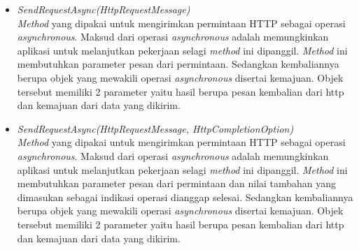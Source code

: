 \begin{itemize}
	\item \textit{SendRequestAsync(HttpRequestMessage)} \\
	\textit{Method} yang dipakai untuk mengirimkan permintaan HTTP sebagai operasi \textit{asynchronous}. Maksud dari operasi \textit{asynchronous} adalah memungkinkan aplikasi untuk melanjutkan pekerjaan selagi \textit{method} ini dipanggil\footnotemark[2]. \textit{Method} ini membutuhkan parameter pesan dari permintaan. Sedangkan kembaliannya berupa objek yang mewakili operasi \textit{asynchronous} disertai kemajuan. Objek tersebut memiliki 2 parameter yaitu hasil berupa pesan kembalian dari http dan kemajuan dari data yang dikirim.
	\item \textit{SendRequestAsync(HttpRequestMessage, HttpCompletionOption)} \\
	\textit{Method} yang dipakai untuk mengirimkan permintaan HTTP sebagai operasi \textit{asynchronous}. Maksud dari operasi \textit{asynchronous} adalah memungkinkan aplikasi untuk melanjutkan pekerjaan selagi \textit{method} ini dipanggil\footnotemark[2]. \textit{Method} ini membutuhkan parameter pesan dari permintaan dan nilai tambahan yang dimasukan sebagai indikasi operasi dianggap selesai. Sedangkan kembaliannya berupa objek yang mewakili operasi \textit{asynchronous} disertai kemajuan. Objek tersebut memiliki 2 parameter yaitu hasil berupa pesan kembalian dari http dan kemajuan dari data yang dikirim.
\end{itemize}


